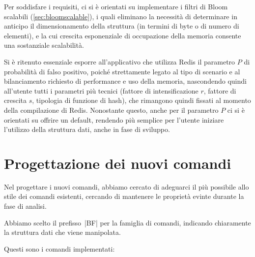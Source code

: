 Per soddisfare i requisiti, ci si è orientati su implementare i filtri di Bloom scalabili
(\autoref{sec:bloomscalable}), i quali eliminano la necessità di determinare in anticipo il
dimensionamento della struttura (in termini di byte o di numero di elementi), e la cui crescita
esponenziale di occupazione della memoria consente una sostanziale scalabilità.

Si è ritenuto essenziale esporre all'applicativo che utilizza Redis il parametro $P$ di probabilità
di falso positivo, poiché strettamente legato al tipo di scenario e al bilanciamento richiesto di
performance e uso della memoria, nascondendo quindi all'utente tutti i parametri più tecnici
(fattore di intensificazione $r$, fattore di crescita $s$, tipologia di funzione di hash), che
rimangono quindi fissati al momento della compilazione di Redis. Nonostante questo, anche per il
parametro $P$ ci si è orientati su offrire un default, rendendo più semplice per l'utente iniziare
l'utilizzo della struttura dati, anche in fase di sviluppo.

\section{Progettazione dei nuovi comandi}
\label{sec:patch:newcommands}

Nel progettare i nuovi comandi, abbiamo cercato di adeguarci il più possibile allo stile dei
comandi esistenti, cercando di mantenere le proprietà evinte durante la fase di analisi.

Abbiamo scelto il prefisso~\cverb|BF| per la famiglia di comandi, indicando chiaramente la
struttura dati che viene manipolata.

Questi sono i comandi implementati:

